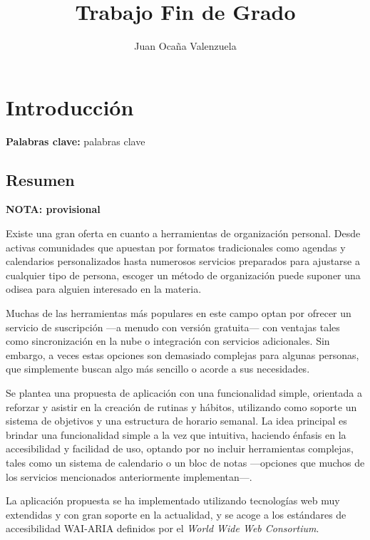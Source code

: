 \documentclass[10pt, a4paper]{aqademic}
\author{Juan Ocaña Valenzuela}
\title{Trabajo Fin de Grado}
\begin{document}
\AqMaketitle[%
	cover    = img/logo.png,
	org      = Grado en Ingeniería Informática,
	subtitle = Aplicación de gestión de rutinas semanales basada en tecnologías web
]
\tableofcontents

\chapter{Introducción}

\textbf{Palabras clave:} palabras clave

\section{Resumen}

\textbf{NOTA: provisional}

Existe una gran oferta en cuanto a herramientas de organización personal. Desde activas comunidades que apuestan por formatos tradicionales como agendas y calendarios personalizados hasta numerosos servicios preparados para ajustarse a cualquier tipo de persona, escoger un método de organización puede suponer una odisea para alguien interesado en la materia. 

\medskip

Muchas de las herramientas más populares en este campo optan por ofrecer un servicio de suscripción ---a menudo con versión gratuita--- con ventajas tales como sincronización en la nube o integración con servicios adicionales. Sin embargo, a veces estas opciones son demasiado complejas para algunas personas, que simplemente buscan algo más sencillo o acorde a sus necesidades.

\medskip

Se plantea una propuesta de aplicación con una funcionalidad simple, orientada a reforzar y asistir en la creación de rutinas y hábitos, utilizando como soporte un sistema de objetivos y una estructura de horario semanal. La idea principal es brindar una funcionalidad simple a la vez que intuitiva, haciendo énfasis en la accesibilidad y facilidad de uso, optando por no incluir herramientas complejas, tales como un sistema de calendario o un bloc de notas ---opciones que muchos de los servicios mencionados anteriormente implementan---.

\medskip

La aplicación propuesta se ha implementado utilizando tecnologías web muy extendidas y con gran soporte en la actualidad, y se acoge a los estándares de accesibilidad WAI-ARIA \cite{einstein} definidos por el \textit{World Wide Web Consortium}.
\end{document}
